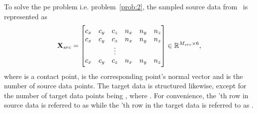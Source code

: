 To solve the \gls{pe} problem i.e. problem~\ref{prob:2}, the sampled source data from~ is represented as
%
\begin{equation} \label{eq:data-matrix-structure}
	\bm{\mathrm{X}}_{src} = 
	\begin{bmatrix}
		c_x & c_y & c_z & n_x & n_y & n_z \\
		c_x & c_y & c_z & n_x & n_y & n_z \\
		 &  & \vdots &  &  &  \\
		c_x & c_y & c_z & n_x & n_y & n_z \\
	\end{bmatrix}\in\mathbb{R}^{M_{src}\times 6},
\end{equation}
where  is a contact point,  is the corresponding point's normal vector and  is the number of source data points. The target data  is structured likewise, except for the number of target data points being , where . For convenience, the 'th row in source data is referred to as  while the 'th row in the target data is referred to as . \medskip 

